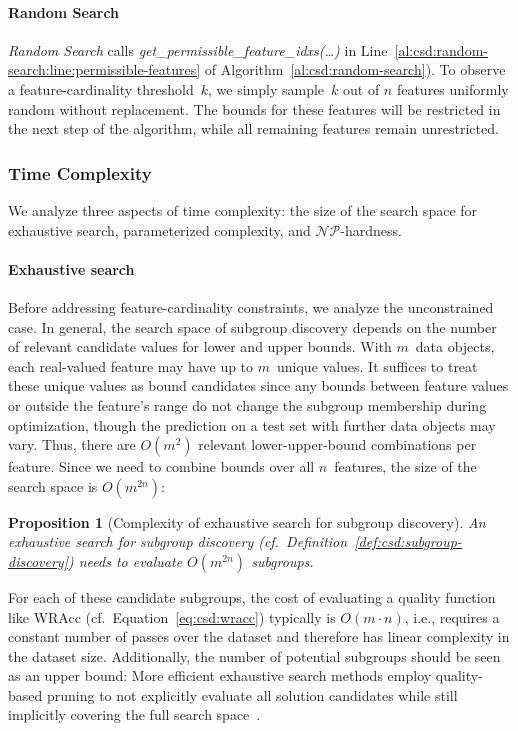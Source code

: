 \documentclass{article}
\newtheorem{proposition}{Proposition}
\theoremstyle{definition}
\begin{document}
\paragraph{Random Search}

\emph{Random Search} calls \emph{get\_permissible\_feature\_idxs(\dots)} in Line~\ref{al:csd:random-search:line:permissible-features} of Algorithm~\ref{al:csd:random-search}).
To observe a feature-cardinality threshold~$k$, we simply sample~$k$ out of $n$ features uniformly random without replacement.
The bounds for these features will be restricted in the next step of the algorithm, while all remaining features remain unrestricted.

\subsubsection{Time Complexity}
\label{sec:csd:approach:cardinality:complexity}

We analyze three aspects of time complexity:
the size of the search space for exhaustive search, parameterized complexity, and $\mathcal{NP}$-hardness.

\paragraph{Exhaustive search}

Before addressing feature-cardinality constraints, we analyze the unconstrained case.
In general, the search space of subgroup discovery depends on the number of relevant candidate values for lower and upper bounds.
With $m$~data objects, each real-valued feature may have up to $m$~unique values.
It suffices to treat these unique values as bound candidates since any bounds between feature values or outside the feature's range do not change the subgroup membership during optimization, though the prediction on a test set with further data objects may vary.
Thus, there are $O(m^2)$ relevant lower-upper-bound combinations per feature.
Since we need to combine bounds over all $n$~features, the size of the search space is $O(m^{2n})$:
%
\begin{proposition}[Complexity of exhaustive search for subgroup discovery]
	An exhaustive search for subgroup discovery (cf.~Definition~\ref{def:csd:subgroup-discovery}) needs to evaluate $O(m^{2n})$ subgroups.
	\label{prop:csd:complexity-unconstrained-exhaustive}
\end{proposition}
%
For each of these candidate subgroups, the cost of evaluating a quality function like WRAcc (cf.~Equation~\ref{eq:csd:wracc}) typically is $O(m \cdot n)$, i.e., requires a constant number of passes over the dataset and therefore has linear complexity in the dataset size.
Additionally, the number of potential subgroups should be seen as an upper bound:
More efficient exhaustive search methods employ quality-based pruning to not explicitly evaluate all solution candidates while still implicitly covering the full search space~\cite{atzmueller2015subgroup}.
\end{document}
